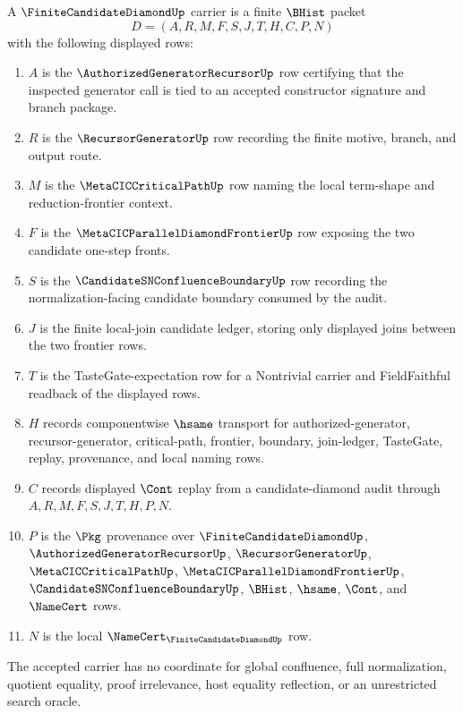\begin{definition}
\label{def:finite-candidate-diamond-carrier}
A $\FiniteCandidateDiamondUp$ carrier is a finite $\BHist$ packet
$$
D=(A,R,M,F,S,J,T,H,C,P,N)
$$
with the following displayed rows:
\begin{enumerate}
\item $A$ is the $\AuthorizedGeneratorRecursorUp$ row certifying that the inspected generator call is tied to an accepted constructor signature and branch package.
\item $R$ is the $\RecursorGeneratorUp$ row recording the finite motive, branch, and output route.
\item $M$ is the $\MetaCICCriticalPathUp$ row naming the local term-shape and reduction-frontier context.
\item $F$ is the $\MetaCICParallelDiamondFrontierUp$ row exposing the two candidate one-step fronts.
\item $S$ is the $\CandidateSNConfluenceBoundaryUp$ row recording the normalization-facing candidate boundary consumed by the audit.
\item $J$ is the finite local-join candidate ledger, storing only displayed joins between the two frontier rows.
\item $T$ is the TasteGate-expectation row for a Nontrivial carrier and FieldFaithful readback of the displayed rows.
\item $H$ records componentwise $\hsame$ transport for authorized-generator, recursor-generator, critical-path, frontier, boundary, join-ledger, TasteGate, replay, provenance, and local naming rows.
\item $C$ records displayed $\Cont$ replay from a candidate-diamond audit through $A,R,M,F,S,J,T,H,P,N$.
\item $P$ is the $\Pkg$ provenance over $\FiniteCandidateDiamondUp$, $\AuthorizedGeneratorRecursorUp$, $\RecursorGeneratorUp$, $\MetaCICCriticalPathUp$, $\MetaCICParallelDiamondFrontierUp$, $\CandidateSNConfluenceBoundaryUp$, $\BHist$, $\hsame$, $\Cont$, and $\NameCert$ rows.
\item $N$ is the local $\NameCert_{\FiniteCandidateDiamondUp}$ row.
\end{enumerate}
The accepted carrier has no coordinate for global confluence, full normalization, quotient equality, proof irrelevance, host equality reflection, or an unrestricted search oracle.
\end{definition}

